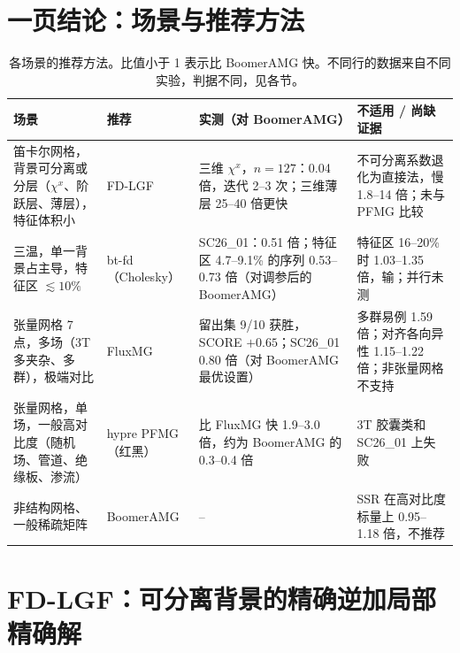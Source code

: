 \documentclass[11pt,a4paper]{ctexart}
\begin{document}
\section{一页结论：场景与推荐方法}\label{sec:choice}
\begin{table}[H]
\centering\small
\renewcommand{\arraystretch}{1.25}
\begin{tabular}{>{\raggedright}p{4.3cm}>{\raggedright}p{2.2cm}>{\raggedright}p{4.4cm}>{\raggedright\arraybackslash}p{4.3cm}}
\toprule
场景 & 推荐 & 实测（对 BoomerAMG） & 不适用 / 尚缺证据 \\
\midrule
笛卡尔网格，背景可分离或分层（$\chi^x$、阶跃层、薄层），特征体积小 & FD-LGF & 三维 $\chi^x$，$n=127$：0.04 倍，迭代 2--3 次；三维薄层 25--40 倍更快 & 不可分离系数退化为直接法，慢 1.8--14 倍；未与 PFMG 比较 \\
三温，单一背景占主导，特征区 $\lesssim10\%$ & bt-fd（Cholesky） & SC26\_01：0.51 倍；特征区 4.7--9.1\% 的序列 0.53--0.73 倍（对调参后的 BoomerAMG） & 特征区 16--20\% 时 1.03--1.35 倍，输；并行未测 \\
张量网格 7 点，多场（3T 多夹杂、多群），极端对比 & FluxMG & 留出集 9/10 获胜，SCORE $+0.65$；SC26\_01 0.80 倍（对 BoomerAMG 最优设置） & 多群易例 1.59 倍；对齐各向异性 1.15--1.22 倍；非张量网格不支持 \\
张量网格，单场，一般高对比度（随机场、管道、绝缘板、渗流） & hypre PFMG（红黑） & 比 FluxMG 快 1.9--3.0 倍，约为 BoomerAMG 的 0.3--0.4 倍 & 3T 胶囊类和 SC26\_01 上失败 \\
非结构网格、一般稀疏矩阵 & BoomerAMG & -- & SSR 在高对比度标量上 0.95--1.18 倍，不推荐 \\
\bottomrule
\end{tabular}
\caption{各场景的推荐方法。比值小于 1 表示比 BoomerAMG 快。不同行的数据来自不同实验，判据不同，见各节。}
\end{table}

\section{FD-LGF：可分离背景的精确逆加局部精确解}
\end{document}
